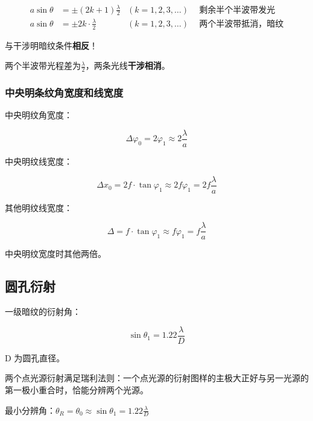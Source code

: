 \begin{equation}
    \begin{aligned}
        a\sin{\theta} & =\pm{}(2k+1)\frac{\lambda{}}{2}    & (k=1,2,3,\dots)~~ & \mbox{剩余半个半波带发光}   \\
        a\sin{\theta} & =\pm{}2k\cdot{}\frac{\lambda{}}{2} & (k=1,2,3,\dots)~~ & \mbox{两个半波带抵消，暗纹}
    \end{aligned}
\end{equation}

与干涉明暗纹条件\textbf{相反}！

两个半波带光程差为$\frac{\lambda}{2}$，两条光线\textbf{干涉相消}。

\subsubsection{中央明条纹角宽度和线宽度}

中央明纹角宽度：

\begin{equation}
    \Delta{\varphi_0}=2\varphi_1\approx{}2\frac{\lambda}{a}
\end{equation}

中央明纹线宽度：

\begin{equation}
    \Delta{x_0}=2f\cdot\tan{\varphi_1}\approx{}2f\varphi_1=2f\frac{\lambda}{a}
\end{equation}

其他明纹线宽度：

\begin{equation}
    \Delta=f\cdot\tan{\varphi_1}\approx{}f\varphi_1=f\frac{\lambda}{a}
\end{equation}

中央明纹宽度时其他两倍。

\subsection{圆孔衍射}

一级暗纹的衍射角：

\begin{equation}
    \sin{\theta_1}=1.22\frac{\lambda}{D}
\end{equation}

D 为圆孔直径。


两个点光源衍射满足瑞利法则：一个点光源的衍射图样的主极大正好与另一光源的第一极小重合时，恰能分辨两个光源。

最小分辨角：$\theta_R=\theta_0\approx{}\sin{\theta_1}=1.22\frac{\lambda}{D}$


